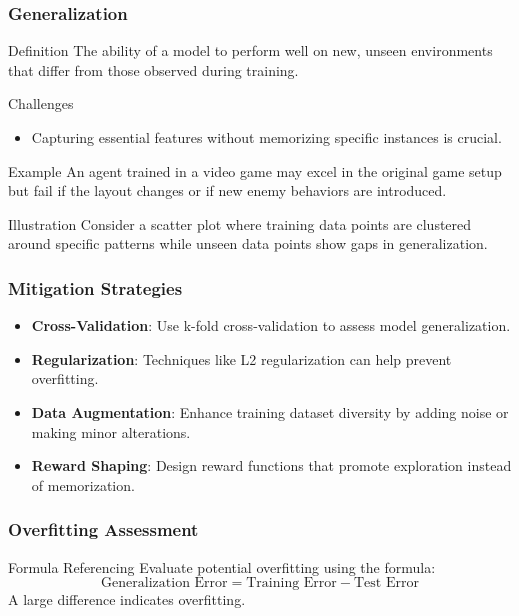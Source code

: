 \documentclass[aspectratio=169]{beamer}
\begin{document}
\begin{frame}[fragile]
    \frametitle{Generalization}
    \begin{block}{Definition}
        The ability of a model to perform well on new, unseen environments that differ from those observed during training.
    \end{block}
    \begin{block}{Challenges}
        \begin{itemize}
            \item Capturing essential features without memorizing specific instances is crucial.
        \end{itemize}
    \end{block}
    \begin{block}{Example}
        An agent trained in a video game may excel in the original game setup but fail if the layout changes or if new enemy behaviors are introduced.
    \end{block}
    \begin{block}{Illustration}
        Consider a scatter plot where training data points are clustered around specific patterns while unseen data points show gaps in generalization.
    \end{block}
\end{frame}

\begin{frame}[fragile]
    \frametitle{Mitigation Strategies}
    \begin{itemize}
        \item \textbf{Cross-Validation}: Use k-fold cross-validation to assess model generalization.
        \item \textbf{Regularization}: Techniques like L2 regularization can help prevent overfitting.
        \item \textbf{Data Augmentation}: Enhance training dataset diversity by adding noise or making minor alterations.
        \item \textbf{Reward Shaping}: Design reward functions that promote exploration instead of memorization.
    \end{itemize}
\end{frame}

\begin{frame}[fragile]
    \frametitle{Overfitting Assessment}
    \begin{block}{Formula Referencing}
        Evaluate potential overfitting using the formula:
        \begin{equation}
            \text{Generalization Error} = \text{Training Error} - \text{Test Error}
        \end{equation}
        A large difference indicates overfitting.
    \end{block}
\end{frame}
\end{document}
